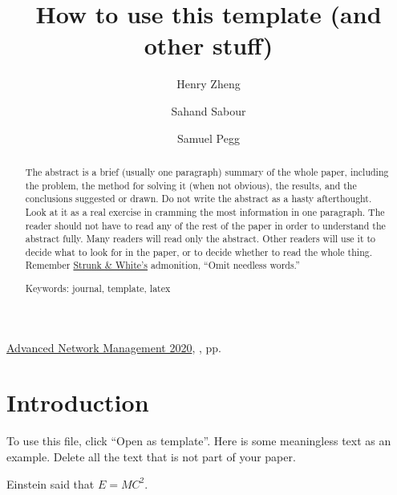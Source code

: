\documentclass[12pt]{article}
\title{How to use this template (and other stuff)}
\author{
Henry Zheng
\and 
  Sahand Sabour
\and
Samuel Pegg
}
\date{} %
\newcommand{\jhead}{Advanced Network Management 2020}
\begin{document}

\begin{htmlonly}
\href{\jref}{\jhead}, \jdate, pp.\
\end{htmlonly}

\maketitle
\thispagestyle{firstpage}

\begin{abstract}

The abstract is a brief (usually one paragraph) summary
of the whole paper, including the problem, the method for solving
it (when not obvious), the results, and the conclusions suggested
or drawn.  Do not write the abstract as a hasty
afterthought. Look at it as a real exercise in cramming the most
information in one paragraph.  The reader should not have to read
any of the rest of the paper in order to understand the abstract
fully.  Many readers will read only the abstract.  Other readers
will use it to decide what to look for in the paper, or to decide
whether to read the whole thing.  Remember 
\href{http://en.wikipedia.org/wiki/The_Elements_of_Style}{Strunk \&
  White's} admonition, ``Omit needless words.''

\smallskip
\noindent
Keywords: journal, template, latex
\end{abstract}

{\renewcommand{\thefootnote}{}
}

\saythanks

\setlength{\baselineskip}{16pt plus.2pt}

\section{Introduction}

To use this file, click ``Open as template''. Here is some meaningless
text as an example. Delete all the text that is not part of your paper.

Einstein said that $E = MC^2$.
\end{document}

